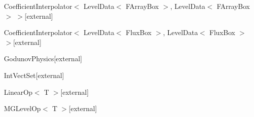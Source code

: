 \begin{DoxyCompactList}
\begin{DoxyCompactList}
\end{DoxyCompactList}
\item {}
\item Coefficient\+Interpolator$<$ Level\+Data$<$ F\+Array\+Box $>$, Level\+Data$<$ F\+Array\+Box $>$ $>${\ttfamily  \mbox{[}external\mbox{]}}\begin{DoxyCompactList}
\item {}
\end{DoxyCompactList}
\item Coefficient\+Interpolator$<$ Level\+Data$<$ Flux\+Box $>$, Level\+Data$<$ Flux\+Box $>$ $>${\ttfamily  \mbox{[}external\mbox{]}}\begin{DoxyCompactList}
\item {}
\end{DoxyCompactList}
\item {}
\item {}
\item {}
\item Godunov\+Physics{\ttfamily  \mbox{[}external\mbox{]}}\begin{DoxyCompactList}
\item {}
\end{DoxyCompactList}
\item {}
\item Int\+Vect\+Set{\ttfamily  \mbox{[}external\mbox{]}}\begin{DoxyCompactList}
\item {}
\end{DoxyCompactList}
\item {}
\item Linear\+Op$<$ T $>${\ttfamily  \mbox{[}external\mbox{]}}\begin{DoxyCompactList}
\item M\+G\+Level\+Op$<$ T $>${\ttfamily  \mbox{[}external\mbox{]}}\begin{DoxyCompactList}

\end{DoxyCompactList}
\end{DoxyCompactList}
\end{DoxyCompactList}
